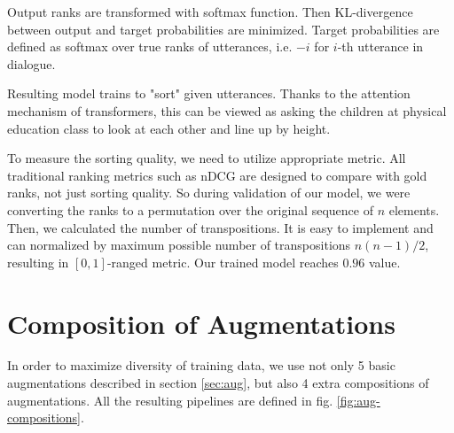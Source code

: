 \documentclass{article}
\begin{document}
Output ranks are transformed with softmax function. Then KL-divergence between output and target probabilities are minimized. Target probabilities are defined as softmax over true ranks of utterances, i.e. $-i$ for $i$-th utterance in dialogue.

Resulting model trains to "sort" given utterances. Thanks to the attention mechanism of transformers, this can be viewed as asking the children at physical education class to look at each other and line up by height.

To measure the sorting quality, we need to utilize appropriate metric. All traditional ranking metrics such as nDCG are designed to compare with gold ranks, not just sorting quality. So during validation of our model, we were converting the ranks to a permutation over the original sequence of $n$ elements. Then, we calculated the number of transpositions. It is easy to implement and can normalized by maximum possible number of transpositions $n(n-1)/2$, resulting in $[0,1]$-ranged metric. Our trained model reaches $0.96$ value.

\section{Composition of Augmentations}

In order to maximize diversity of training data, we use not only 5 basic augmentations described in section \ref{sec:aug}, but also 4 extra compositions of augmentations. All the resulting pipelines are defined in fig. \ref{fig:aug-compositions}. 
\end{document}
